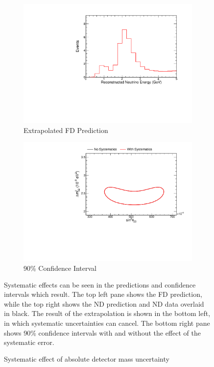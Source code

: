 {\begin{figure}
\begin{center}
\begin{subfigure}[c]{0.49\textwidth}
\includegraphics[width=\textwidth]{figures/systs/prediction/fd_extrap_prediction_massNormAbs.pdf}
\caption*{Extrapolated FD Prediction}
\end{subfigure}
\begin{subfigure}[c]{0.49\textwidth}
\includegraphics[width=\textwidth]{figures/systs/prediction/fd_extrap_contour_massNormAbs.pdf}
\caption*{90\% Confidence Interval}
\end{subfigure}
\end{center}
\caption{Systematic effect of absolute detector mass uncertainty}{
Systematic effects can be seen in the predictions and confidence intervals
which result.
The top left pane shows the FD prediction, while the top right shows the
ND prediction and ND data overlaid in black.
The result of the extrapolation is shown in the bottom left, in which
systematic uncertainties can cancel.
The bottom right pane shows 90\% confidence intervals with and without
the effect of the systematic error.}
\label{syst_fig_massNormAbs}


\end{figure}}
